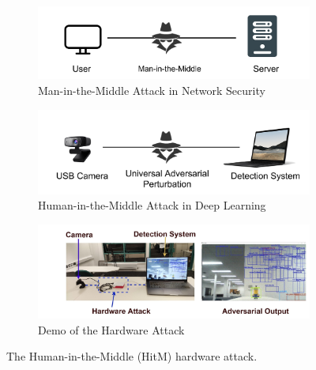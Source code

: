 
\begin{figure}[H]
    \centering
    \begin{subfigure}[b]{\linewidth}
        \includegraphics[width=\linewidth]{figures/chapter_detection/hardware/mitm.png}
        \caption{Man-in-the-Middle Attack in Network Security}
        \label{fig:mitm} 
    \end{subfigure}

    \begin{subfigure}[b]{\linewidth}
        \includegraphics[width=\linewidth]{figures/chapter_detection/hardware/overview.png}
        \caption{Human-in-the-Middle Attack in Deep Learning}
        \label{fig:minm}
    \end{subfigure}

    \begin{subfigure}[b]{\linewidth}
        \includegraphics[width=\linewidth]{figures/chapter_detection/hardware/demo.jpg}
        \caption{Demo of the Hardware Attack}
        \label{fig:demo}
    \end{subfigure}

  \caption{The Human-in-the-Middle (HitM)  hardware attack.}
  \label{fig:overview}
\end{figure}

